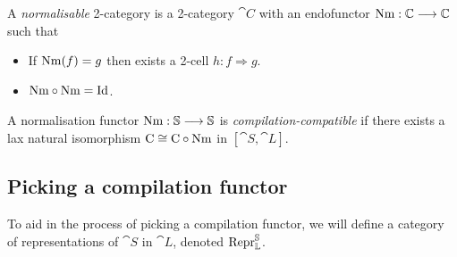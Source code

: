 \begin{definition}
  A \emph{normalisable} 2-category is a 2-category $\cat C$ with an
  endofunctor $\mathrm{Nm} : \mathbb C \longrightarrow \mathbb C$ such that
  \begin{itemize}
    \item If $\mathrm{Nm} (f) = g$ then exists a 2-cell $h : f \Rightarrow g$.
    \item $\mathrm{Nm} \circ \mathrm{Nm} = \mathrm{Id}$.
  \end{itemize}
\end{definition}

\begin{definition}
  A normalisation functor $\mathrm{Nm} : \mathbb S \longrightarrow \mathbb S$
  is \emph{compilation-compatible} if there exists a lax natural isomorphism
  $\mathrm{C} \cong \mathrm{C} \circ \mathrm{Nm}$ in
  $[\cat S, \cat L]$.
\end{definition}



\subsection{Picking a compilation functor}

To aid in the process of picking a compilation functor, we will define a
category of representations of $\cat S$ in $\cat L$, denoted $\mathrm{Repr} _{\mathbb L}
  ^{\mathbb S}$.


